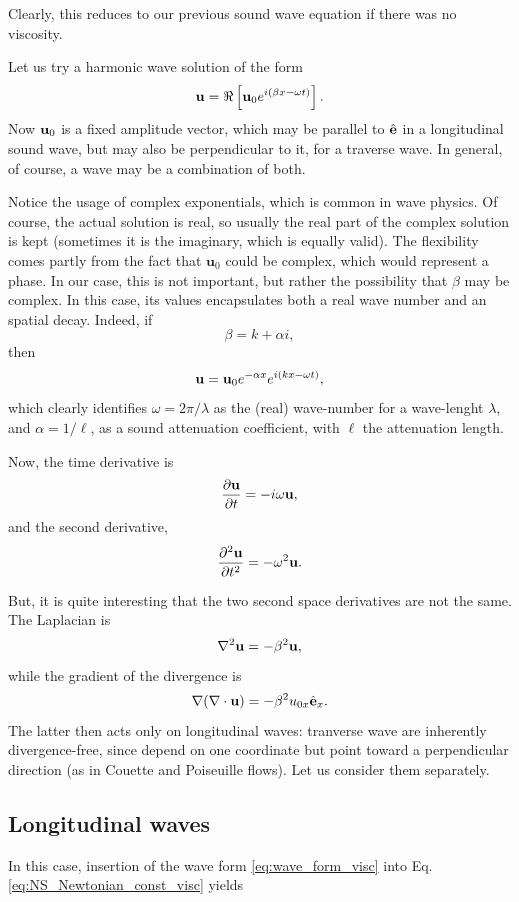 Clearly, this reduces to our previous sound wave equation if there was
no viscosity.

Let us try a harmonic wave solution of the form
\begin{equation}
  \label{eq:wave_form_visc}
  \mathbf{u} = \Re\left[ \mathbf{u}_0 e^{i( \beta x - \omega t)} \right].
\end{equation}
Now $\mathbf{u}_0$ is a fixed amplitude vector, which may be parallel to
$\hat{\mathbf{e}}$ in a longitudinal sound wave, but may also be perpendicular to
it, for a traverse wave. In general, of course, a wave may be a
combination of both.

Notice the usage of complex exponentials, which is common in wave
physics. Of course, the actual solution is real, so usually the real
part of the complex solution is kept (sometimes it is the imaginary,
which is equally valid). The flexibility comes partly from the fact
that $\mathbf{u}_0$ could be complex, which would represent a phase.
In our case, this is not important, but rather the possibility that
$\beta$ may be complex. In this case, its values encapsulates both a
real wave number and an spatial decay. Indeed, if
\[
  \beta = k + \alpha i ,
\]
then
\[
  \mathbf{u} = \mathbf{u}_0e^{- \alpha x} e^{i(k x - \omega t )} ,
\]
which clearly identifies $ \omega=2\pi /\lambda$ as the (real)
wave-number for a wave-lenght $ \lambda$, and $ \alpha=1 /\ell $, as a
sound attenuation coefficient, with $ \ell $ the attenuation length.

Now, the time derivative is
\[
  \frac{\partial \mathbf{u}  }{\partial t }  = -i \omega \mathbf{u} ,
\]
and the second derivative,
\[
  \frac{\partial^2 \mathbf{u}   }{\partial t^2 }  = -\omega^2 \mathbf{u}.
\]

But, it is quite interesting that the two second space derivatives are
not the same. The Laplacian is
\[
\nabla^2 \mathbf{u} = -\beta^2 \mathbf{u},
\]
while the gradient of the divergence is
\[
\nabla (\nabla\cdot \mathbf{u} ) = -\beta^2 u_{0x} \hat{\mathbf{e}}_x.
\]
%
The latter then acts only on longitudinal waves: tranverse wave are
inherently divergence-free, since depend on one coordinate but point
toward a perpendicular direction (as in Couette and Poiseuille flows).
Let us consider them separately.

\subsection{Longitudinal waves}

In this case, insertion of the wave form \ref{eq:wave_form_visc} into
Eq. \ref{eq:NS_Newtonian_const_visc} yields

